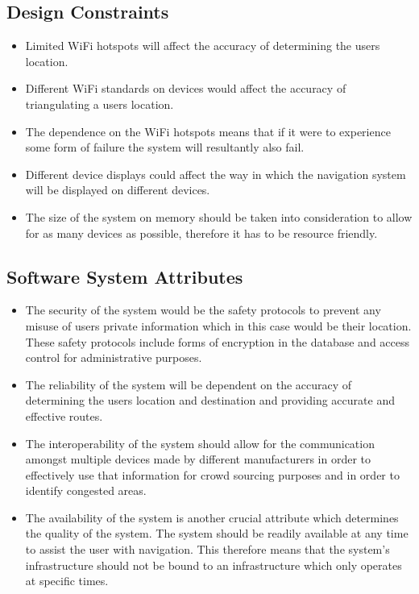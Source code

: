 \documentclass{article}
\begin{document}
		\subsection{Design Constraints}\label{sec:design-constraints}
			\begin{itemize}
			\small
			\item Limited WiFi hotspots will affect the accuracy of determining the users location.
			\item Different WiFi standards on devices would affect the accuracy of triangulating a users location.
			\item The dependence on the WiFi hotspots means that if it were to experience some form of failure the system will resultantly also fail.
			\item Different device displays could affect the way in which the navigation system will be displayed on different devices.
			\item The size of the system on memory should be taken into consideration to allow for as many devices as possible, therefore it has to be resource friendly.
			\end{itemize}
		
	
		\subsection{Software System Attributes}\label{sec:design-constraints}
			\begin{itemize}
			\small
			\item The security of the system would be the safety protocols to prevent any misuse of users private information which in this case would be their location. These safety protocols include forms of encryption in the database and access control for administrative purposes.
			\item The reliability of the system will be dependent on the accuracy of determining the users location and destination and providing accurate and effective routes.
			\item The interoperability of the system should allow for the communication amongst multiple devices made by different manufacturers in order to effectively use that information for crowd sourcing purposes and in order to identify congested areas.
			\item The availability of the system is another crucial attribute which determines the quality of the system. The system should be readily available at any time to assist the user with navigation. This therefore means that the system’s infrastructure should not be bound to an infrastructure which only operates at specific times.
			\end{itemize}
			
\end{document}
